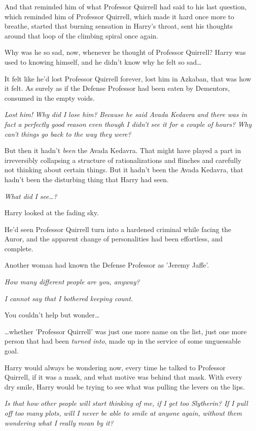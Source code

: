 And that reminded him of what Professor Quirrell had said to his last question, 
which reminded him of Professor Quirrell, which made it hard once more to 
breathe, started that burning sensation in Harry's throat, sent his thoughts 
around that loop of the climbing spiral once again.

Why was he so sad, now, whenever he thought of Professor Quirrell? Harry was 
used to knowing himself, and he didn't know why he felt so sad{\ldots}

It felt like he'd lost Professor Quirrell forever, lost him in Azkaban, that 
was how it felt. As surely as if the Defense Professor had been eaten by 
Dementors, consumed in the empty voids.

\emph{Lost him! Why did I lose him? Because he said Avada Kedavra and there was 
in fact a perfectly good reason even though I didn't see it for a couple of 
hours? Why can't things go back to the way they were?}

But then it hadn't \emph{been} the Avada Kedavra. That might have played a part 
in irreversibly collapsing a structure of rationalizations and flinches and 
carefully not thinking about certain things. But it hadn't been the Avada 
Kedavra, that hadn't been the disturbing thing that Harry had seen.

\emph{What did I see{\ldots}?}

Harry looked at the fading sky.

He'd seen Professor Quirrell turn into a hardened criminal while facing the 
Auror, and the apparent change of personalities had been effortless, and 
complete.

Another woman had known the Defense Professor as 'Jeremy Jaffe'.

\emph{How many different people are you, anyway?}

\emph{I cannot say that I bothered keeping count.}

You couldn't help but wonder{\ldots}

{\ldots}whether 'Professor Quirrell' was just one more name on the list, just 
one more person that had been \emph{turned into}, made up in the service of 
some unguessable goal.

Harry would always be wondering now, every time he talked to Professor 
Quirrell, if it was a mask, and what motive was behind that mask. With every 
dry smile, Harry would be trying to see what was pulling the levers on the lips.

\emph{Is that how other people will start thinking of me, if I get too 
Slytherin? If I pull off too many plots, will I never be able to smile at 
anyone again, without them wondering what I really mean by it?}

